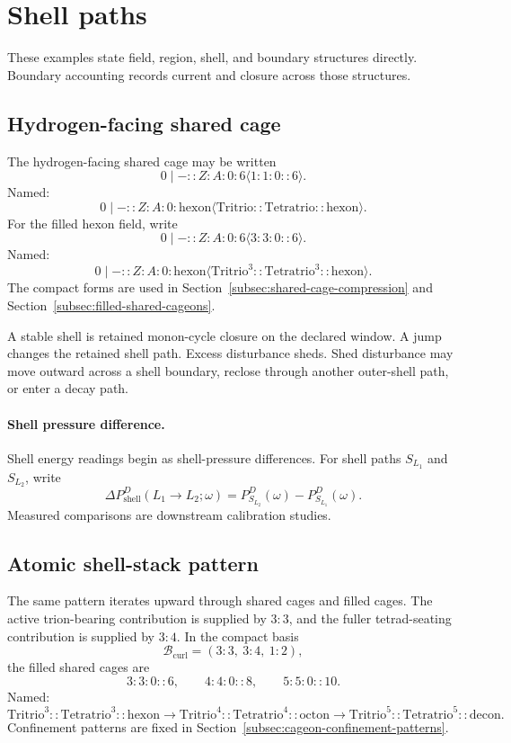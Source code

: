 \section{Shell paths}\label{sec:shell-paths}

These examples state field, region, shell, and boundary structures directly. Boundary accounting records current and closure across those structures.

\subsection{Hydrogen-facing shared cage}\label{subsec:hydrogen-facing-shared-cage}
The hydrogen-facing shared cage may be written
\[
0\mid-::Z:A:0:6\langle 1:1:0::6\rangle.
\]
Named:
\[
0\mid-::Z:A:0:\mathrm{hexon}\langle \mathrm{Tritrio}::\mathrm{Tetratrio}::\mathrm{hexon}\rangle.
\]
For the filled hexon field, write
\[
0\mid-::Z:A:0:6\langle 3:3:0::6\rangle.
\]
Named:
\[
0\mid-::Z:A:0:\mathrm{hexon}\langle \mathrm{Tritrio}^{3}::\mathrm{Tetratrio}^{3}::\mathrm{hexon}\rangle.
\]
The compact forms are used in Section~\ref{subsec:shared-cage-compression} and Section~\ref{subsec:filled-shared-cageons}.

A stable shell is retained monon-cycle closure on the declared window. A jump changes the retained shell path. Excess disturbance sheds. Shed disturbance may move outward across a shell boundary, reclose through another outer-shell path, or enter a decay path.

\paragraph{Shell pressure difference.}
Shell energy readings begin as shell-pressure differences. For shell paths \(S_{L_1}\) and \(S_{L_2}\), write
\[
\Delta P^D_{\mathrm{shell}}(L_1\to L_2;\omega)=
P^D_{S_{L_2}}(\omega)-P^D_{S_{L_1}}(\omega).
\]
Measured comparisons are downstream calibration studies.

\subsection{Atomic shell-stack pattern}\label{subsec:atomic-shell-stack-pattern}
The same pattern iterates upward through shared cages and filled cages. The active trion-bearing contribution is supplied by \(3:3\), and the fuller tetrad-seating contribution is supplied by \(3:4\). In the compact basis
\[
\mathcal B_{\mathrm{curl}}=(3:3,\ 3:4,\ 1:2),
\]
the filled shared cages are
\[
3:3:0::6,
\qquad
4:4:0::8,
\qquad
5:5:0::10.
\]
Named:
\[
\mathrm{Tritrio}^{3}::\mathrm{Tetratrio}^{3}::\mathrm{hexon}
\to
\mathrm{Tritrio}^{4}::\mathrm{Tetratrio}^{4}::\mathrm{octon}
\to
\mathrm{Tritrio}^{5}::\mathrm{Tetratrio}^{5}::\mathrm{decon}.
\]
Confinement patterns are fixed in Section~\ref{subsec:cageon-confinement-patterns}.

